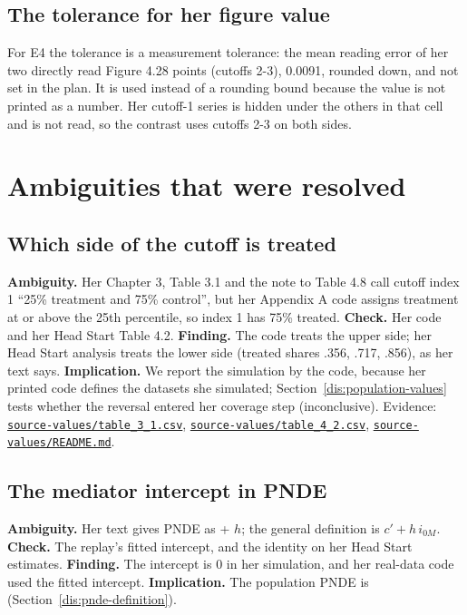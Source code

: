 \subsection{The tolerance for her figure value}\label{sec:ass-tol}
For E4 the tolerance is a measurement tolerance: the mean reading error of her two directly read Figure 4.28 points (cutoffs 2-3), 0.0091, rounded down, and not set in the plan. It is used instead of a rounding bound because the value is not printed as a number. Her cutoff-1 series is hidden under the others in that cell and is not read, so the contrast uses cutoffs 2-3 on both sides.

\section{Ambiguities that were resolved}\label{sec:ambiguities}

\subsection{Which side of the cutoff is treated}\label{sec:amb-cutoff}
\textbf{Ambiguity.} Her Chapter 3, Table 3.1 and the note to Table 4.8 call cutoff index 1 ``25\% treatment and 75\% control'', but her Appendix A code assigns treatment at or above the 25th percentile, so index 1 has 75\% treated. \textbf{Check.} Her code and her Head Start Table 4.2. \textbf{Finding.} The code treats the upper side; her Head Start analysis treats the lower side (treated shares .356, .717, .856), as her text says. \textbf{Implication.} We report the simulation by the code, because her printed code defines the datasets she simulated; Section~\ref{dis:population-values} tests whether the reversal entered her coverage step (inconclusive). Evidence: \href{https://github.com/alectionary/vibe-math/blob/master/formalization/chen-rdd-mediation/source-values/table_3_1.csv}{\nolinkurl{source-values/table_3_1.csv}}, \href{https://github.com/alectionary/vibe-math/blob/master/formalization/chen-rdd-mediation/source-values/table_4_2.csv}{\nolinkurl{source-values/table_4_2.csv}}, \href{https://github.com/alectionary/vibe-math/blob/master/formalization/chen-rdd-mediation/source-values/README.md}{\nolinkurl{source-values/README.md}}.

\subsection{The mediator intercept in PNDE}\label{sec:amb-pnde}
\textbf{Ambiguity.} Her text gives PNDE as \cp{} + $h$; the general definition is $c' + h\,i_{0M}$. \textbf{Check.} The replay's fitted intercept, and the identity on her Head Start estimates. \textbf{Finding.} The intercept is 0 in her simulation, and her real-data code used the fitted intercept. \textbf{Implication.} The population PNDE is \cp{} (Section~\ref{dis:pnde-definition}).

